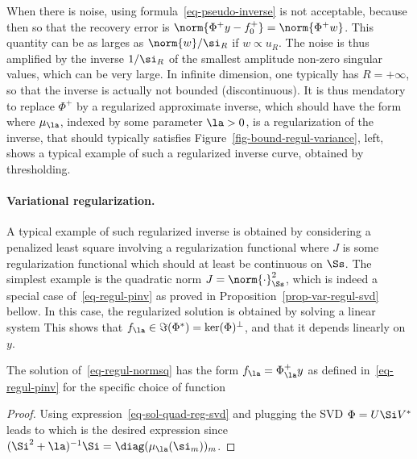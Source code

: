 When there is noise, using formula~\eqref{eq-pseudo-inverse} is not acceptable, because then 
so that the recovery error is $\norm{\Phi^+ y -f_0^+} = \norm{\Phi^+ w}$. This quantity can be as larges as $\norm{w}/\si_R$ if $w \propto u_R$. The noise is thus amplified by the inverse $1/\si_R$ of the smallest amplitude non-zero singular values, which can be very large. In infinite dimension, one typically has $R=+\infty$, so that the inverse is actually not bounded (discontinuous). It is thus mendatory to replace $\Phi^+$ by a regularized approximate inverse, which should have the form 
where $\mu_\la$, indexed by some parameter $\la>0$, is a regularization of the inverse, that should typically satisfies 
Figure~\ref{fig-bound-regul-variance}, left, shows a typical example of such a regularized inverse curve, obtained by thresholding.


\paragraph{Variational regularization.}

A typical example of such regularized inverse is obtained by considering a penalized least square involving a regularization functional
where $J$ is some regularization functional which should at least be continuous on $\Ss$. The simplest example is the quadratic norm $J=\norm{\cdot}_\Ss^2$, 
which is indeed a special case of~\eqref{eq-regul-pinv} as proved in Proposition~\ref{prop-var-regul-svd} bellow. In this case, the regularized solution is obtained by solving a linear system
This shows that $f_\la \in \Im(\Phi^*) = \ker(\Phi)^\bot$, and that it depends linearly on $y$. 

\begin{prop}\label{prop-var-regul-svd}
	The solution of~\eqref{eq-regul-normsq} has the form $f_\la = \Phi^+_\la y$ as defined in~\eqref{eq-regul-pinv} for the specific choice of function
\end{prop} 
\begin{proof}
Using expression~\eqref{eq-sol-quad-reg-svd} and plugging the SVD $\Phi = U \Si V^*$ leads to
which is the desired expression since $(\Si^2 + \la)^{-1} \Si = \diag(\mu_\la(\si_m))_m$.
\end{proof}

